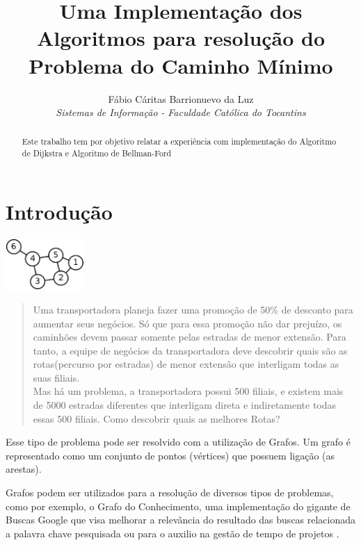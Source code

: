 \documentclass[a4paper,10pt]{article}
\title{Uma Implementação dos Algoritmos para resolução do Problema do Caminho Mínimo}
\author{Fábio Cáritas Barrionuevo da Luz
\\\small{
\textit{Sistemas de Informação - }
\textit{Faculdade Católica do Tocantins}
}
}
\begin{document}
\maketitle
\tableofcontents
\begin{abstract}
\begin{center}
Este trabalho tem por objetivo relatar a experiência com implementação do Algoritmo de Dijkstra e Algoritmo de Bellman-Ford
\end{center}
\end{abstract}
\newpage

\section{Introdução}{
\begin{center}
\includegraphics[width=3cm]{grafo_6v_7_arestas.eps}

\end{center}    
\begin{quotation}
Uma transportadora planeja fazer uma promoção de 50\% de desconto para aumentar seus negócios.
Só que para essa promoção não dar prejuízo, os caminhões devem passar somente pelas estradas de menor extensão.
Para tanto, a equipe de negócios da transportadora deve descobrir quais são as rotas(percurso por estradas) de menor extensão que interligam todas as suas filiais.\\
Mas há um problema, a transportadora possui 500 filiais, e existem mais de 5000 estradas diferentes que interligam direta e indiretamente todas essas 500 filiais.
Como descobrir quais as melhores Rotas?
\end{quotation}


Esse tipo de problema pode ser resolvido com a utilização de Grafos.
Um grafo é representado como um conjunto de pontos (vértices) que possuem ligação (as arestas).




Grafos podem ser utilizados para a resolução de diversos tipos de problemas, como por exemplo, o Grafo do Conhecimento\cite{1}\cite{2}, uma 
implementação do gigante de Buscas Google que visa melhorar a relevância do resultado das buscas relacionada a palavra chave pesquisada 
ou para o auxilio na gestão de tempo de projetos \cite{3}.

}
\end{document}
